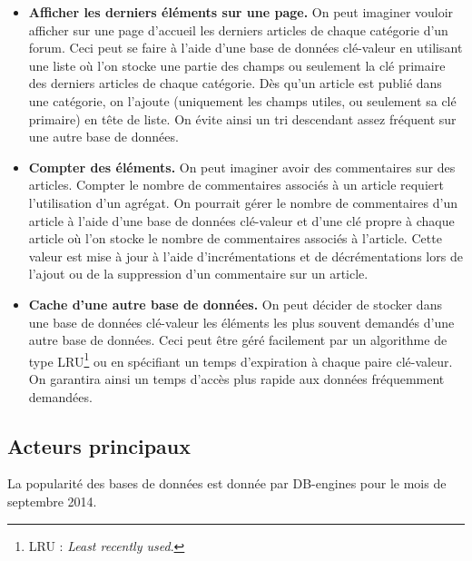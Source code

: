 	\begin{itemize}
	 	\item \textbf{Afficher les derniers éléments sur une page.} On peut imaginer vouloir afficher sur une page d'accueil les derniers articles de chaque catégorie d'un forum. Ceci peut se faire à l'aide d'une base de données clé-valeur en utilisant une liste où l'on stocke une partie des champs ou seulement la clé primaire des derniers articles de chaque catégorie. Dès qu'un article est publié dans une catégorie, on l'ajoute (uniquement les champs utiles, ou seulement sa clé primaire) en tête de liste. On évite ainsi un tri descendant assez fréquent sur une autre base de données.
	 	\item \textbf{Compter des éléments.} On peut imaginer avoir des commentaires sur des articles. Compter le nombre de commentaires associés à un article requiert l'utilisation d'un agrégat. On pourrait gérer le nombre de commentaires d'un article à l'aide d'une base de données clé-valeur et d'une clé propre à chaque article où l'on stocke le nombre de commentaires associés à l'article. Cette valeur est mise à jour à l'aide d'incrémentations et de décrémentations lors de l'ajout ou de la suppression d'un commentaire sur un article.
	 	\item \textbf{Cache d'une autre base de données.} On peut décider de stocker dans une base de données clé-valeur les éléments les plus souvent demandés d'une autre base de données. Ceci peut être géré facilement par un algorithme de type LRU\footnote{LRU : \textit{Least recently used}.} ou en spécifiant un temps d'expiration à chaque paire clé-valeur. On garantira ainsi un temps d'accès plus rapide aux données fréquemment demandées.
	 \end{itemize} 

\subsection{Acteurs principaux}
	La popularité des bases de données est donnée par DB-engines\cite{db_engines_key_value} pour le mois de septembre 2014.

